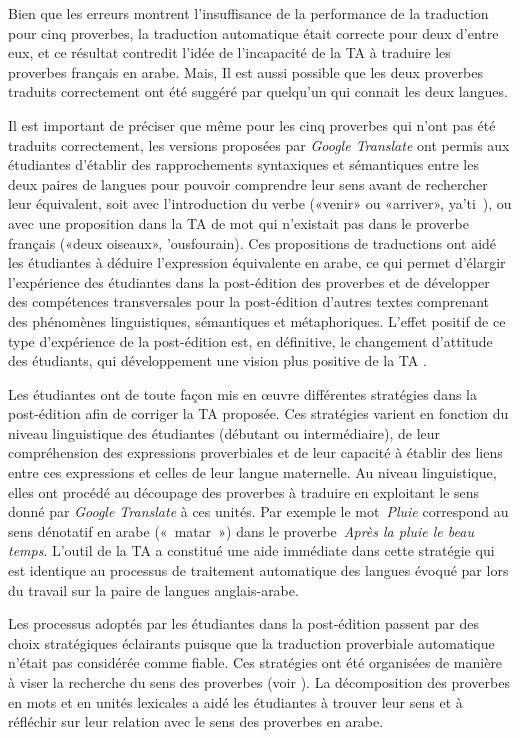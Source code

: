 \documentclass[french]{textolivre}
\begin{document}
Bien que les erreurs montrent l’insuffisance de la performance de la traduction pour cinq proverbes, la traduction automatique était correcte pour deux d’entre eux, et ce résultat contredit l’idée de l’incapacité de la TA à traduire les proverbes français en arabe. Mais, Il est aussi possible que les deux proverbes traduits correctement ont été suggéré par quelqu’un qui connait les deux langues.

Il est important de préciser que même pour les cinq proverbes qui n’ont pas été traduits correctement,  
les versions proposées par \textit{Google Translate} ont permis aux étudiantes d’établir des rapprochements syntaxiques 
et sémantiques entre les deux paires de langues pour pouvoir comprendre leur sens avant de rechercher leur équivalent, 
soit avec l’introduction du verbe  («venir» ou «arriver», ya'ti ), ou avec une proposition dans 
la TA de mot qui n’existait pas dans le proverbe français  («deux oiseaux», 'ousfourain). 
Ces propositions de traductions ont aidé les étudiantes à déduire l’expression équivalente en arabe, ce qui permet 
d’élargir l’expérience des étudiantes dans la post-édition des proverbes et de développer des compétences transversales 
pour la post-édition d’autres textes comprenant des phénomènes linguistiques, sémantiques et métaphoriques. L’effet positif de ce type d’expérience de la post-édition est, en définitive, le changement d’attitude des étudiants, qui développement une vision plus positive de la TA \cite[p.~13]{koponen_how_2015}.

Les étudiantes ont de toute façon mis en œuvre différentes stratégies dans la post-édition afin de corriger la TA proposée. 
Ces stratégies varient en fonction du niveau linguistique des étudiantes (débutant ou intermédiaire), de leur compréhension 
des expressions proverbiales et de leur capacité à établir des liens entre ces expressions et celles de leur langue maternelle. 
Au niveau linguistique, elles ont procédé au découpage des proverbes à traduire en exploitant le sens donné par \textit{Google Translate} 
à ces unités. Par exemple le mot \textit{Pluie} correspond au sens dénotatif en arabe (« matar ») dans le proverbe \textit{Après la pluie le beau temps}. 
L’outil de la TA a constitué une aide immédiate dans cette stratégie qui est identique au processus de traitement automatique des 
langues évoqué par \textcite{bessou_contribution_2019} lors du travail sur la paire de langues anglais-arabe.

Les processus adoptés par les étudiantes dans la post-édition passent par des choix stratégiques éclairants puisque que la traduction proverbiale automatique n’était pas considérée comme fiable. Ces stratégies ont été organisées de manière à viser la recherche du sens des proverbes (voir ). La décomposition des proverbes en mots et en unités lexicales a aidé les étudiantes à trouver leur sens et à réfléchir sur leur relation avec le sens des proverbes en arabe.
\end{document}
